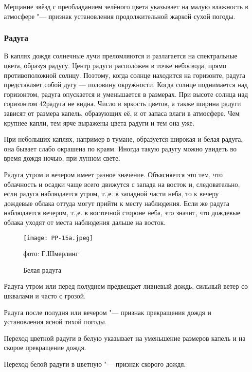  Мерцание звёзд с преобладанием зелёного цвета указывает на
малую влажность в атмосфере "--- признак установления продолжительной
жаркой сухой погоды.

\subsubsection{Радуга}

В каплях дождя солнечные лучи преломляются и разлагается на
спектральные цвета, образуя радугу. Центр радуги расположен в точке
небосвода, прямо противоположной солнцу. Поэтому, когда солнце
находится на горизонте, радуга представляет собой дугу — половину
окружности. Когда солнце поднимается над горизонтом, радуга опускается
и уменьшается в размерах. При высоте солнца над горизонтом 42\gr радуга
не видна. Число и яркость цветов, а также ширина радуги зависят от
размера капель, образующих её, и от запаса влаги в атмосфере. Чем
крупнее капли, тем ярче выражены цвета радуги и тем она уже.

При небольших каплях, например в тумане, образуется широкая и белая
радуга, она бывает слабо окрашена по краям. Иногда такую радугу можно
увидеть во время дождя ночью, при лунном свете.

Радуга утром и вечером имеет разное значение. Объясняется это тем, что
облачность и осадки чаще всего движутся с запада на восток и,
следовательно, если радуга наблюдается утром, т.\=,е. в западной части
неба, то к вечеру дождевые облака оттуда могут прийти к месту
наблюдения. Если же радуга наблюдается вечером, т.\=,е. в восточной
стороне неба, это значит, что дождевые облака уходят от места
наблюдения дальше на восток.

\begin{figure}[htb]
  \centering{}
  \texttt{[image: PP-15a.jpeg]}
  \caption{Белая радуга}
  \label{fig:pp15a}
  \small
  \centering{}фото: Г.Шмерлинг
\end{figure}

 Радуга утром или перед полуднем предвещает ливневый дождь,
сильный ветер со шквалами и часто с грозой.

 Радуга после полудня или вечером "--- признак прекращения дождя и
установления ясной тихой погоды.

 Переход цветной радуги в белую указывает на уменьшение
размеров капель и на скорое прекращение дождя.

 Переход белой радуги в цветную "--- признак скорого дождя.


